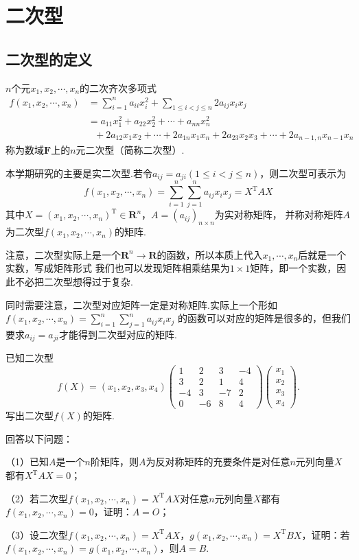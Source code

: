 \chapter{二次型}

\section{二次型的定义}
\begin{definition}
	$n$个元$x_1,x_2,\cdots,x_n$的二次齐次多项式
	\begin{align*}
		f(x_1,x_2,\cdots,x_n) &= \sum_{i=1}^{n}a_{ii}x_i^2+\sum\limits_{1\le i<j\le n}2a_{ij}x_ix_j \\
							  &= a_{11}x_1^2+a_{22}x_2^2+\cdots+a_{nn}x_n^2 \\
							  &\ \ \ +2a_{12}x_1x_2+\cdots+2a_{1n}x_1x_n+2a_{23}x_2x_3+\cdots+2a_{n-1,n}x_{n-1}x_n
	\end{align*}
	称为数域$\mathbf{F}$上的$n$元二次型（简称二次型）.
\end{definition}
本学期研究的主要是实二次型.若令$a_{ij}=a_{ji}(1\le i<j\le n)$，则二次型可表示为
$$f(x_1,x_2,\cdots,x_n)=\sum_{i=1}^{n}\sum_{j=1}^{n}a_{ij}x_ix_j=X^\mathrm{T}AX$$
其中$X=(x_1,x_2,\cdots,x_n)^\mathrm{T}\in\mathbf{R}^n$，$A=(a_{ij})_{n\times n}$为实对称矩阵，
并称对称矩阵$A$为二次型$f(x_1,x_2,\cdots,x_n)$的矩阵.

注意，二次型实际上是一个$\mathbf{R}^n\to\mathbf{R}$的函数，所以本质上代入$x_1,\cdots,x_n$后就是一个实数，写成矩阵形式
我们也可以发现矩阵相乘结果为$1\times 1$矩阵，即一个实数，因此不必把二次型想得过于复杂.

同时需要注意，二次型对应矩阵一定是对称矩阵.实际上一个形如$f(x_1,x_2,\cdots,x_n)=\sum\limits_{i=1}^{n}\sum\limits_{j=1}^{n}a_{ij}x_ix_j$
的函数可以对应的矩阵是很多的，但我们要求$a_{ij}=a_{ji}$才能得到二次型对应的矩阵.
\begin{example}
	已知二次型
	$$f(X)=(x_1,x_2,x_3,x_4)\begin{pmatrix}
		1 & 2 & 3 & -4 \\ 3 & 2 & 1 & 4 \\ -4 & 3 & -7 & 2 \\ 0 & -6 & 8 & 4
	\end{pmatrix}\begin{pmatrix}
		x_1 \\ x_2 \\ x_3 \\ x_4
	\end{pmatrix}.$$
	写出二次型$f(X)$的矩阵.
\end{example}
\begin{example}
	回答以下问题：

	\textup{（1）}已知$A$是一个$n$阶矩阵，则$A$为反对称矩阵的充要条件是对任意$n$元列向量$X$都有$X^\mathrm{T}AX=0$\textup{；}
	
	\textup{（2）}若二次型$f(x_1,x_2,\cdots,x_n)=X^\mathrm{T}AX$对任意$n$元列向量$X$都有$f(x_1,x_2,\cdots,x_n)=0$，证明：$A=O$\textup{；}
	
	\textup{（3）}设二次型$f(x_1,x_2,\cdots,x_n)=X^\mathrm{T}AX$，$g(x_1,x_2,\cdots,x_n)=X^\mathrm{T}BX$，证明：若$f(x_1,x_2,\cdots,x_n)=
	g(x_1,x_2,\cdots,x_n)$，则$A=B$.
\end{example}

